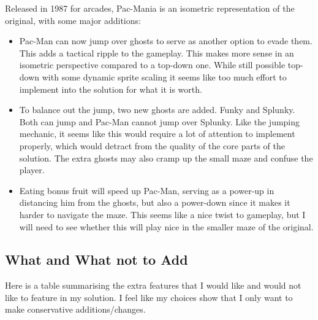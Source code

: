 \documentclass[letterpaper, 11pt]{article}
\begin{document}
Released in 1987 for arcades, Pac-Mania is an isometric representation of the original, with some major additions:

\begin{itemize}
\item Pac-Man can now jump over ghosts to serve as another option to evade them.
This adds a tactical ripple to the gameplay.
This makes more sense in an isometric perspective compared to a top-down one.
While still possible top-down with some dynamic sprite scaling it seems like too much effort to implement into the solution for what it is worth.

\item To balance out the jump, two new ghosts are added.
Funky and Splunky.
Both can jump and Pac-Man cannot jump over Splunky.
Like the jumping mechanic, it seems like this would require a lot of attention to implement properly, which would detract from the quality of the core parts of the solution.
The extra ghosts may also cramp up the small maze and confuse the player.

\item Eating bonus fruit will speed up Pac-Man, serving as a power-up in distancing him from the ghosts, but also a power-down since it makes it harder to navigate the maze.
This seems like a nice twist to gameplay, but I will need to see whether this will play nice in the smaller maze of the original.
\end{itemize}

\subsection{What and What not to Add}
\label{sec:orge1a6947}
Here is a table summarising the extra features that I would like and would not like to feature in my solution.
I feel like my choices show that I only want to make conservative additions/changes.
\end{document}
